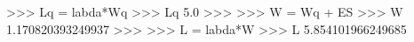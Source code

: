 
>>> Lq = labda*Wq
>>> Lq
5.0
>>>
>>> W = Wq + ES
>>> W
1.170820393249937
>>>
>>> L = labda*W
>>> L
5.854101966249685

